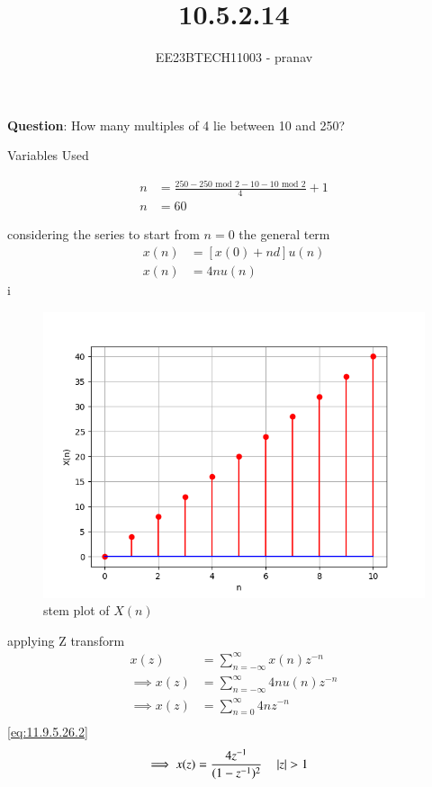 \documentclass[journal,12pt,twocolumn]{IEEEtran}
\theoremstyle{remark}
\begin{document}

\vspace{3cm}

\title{10.5.2.14}
\author{EE23BTECH11003 - pranav}
\maketitle
\newpage

\bigskip
\renewcommand{\thefigure}{\arabic{figure}}
\renewcommand{\thetable}{\arabic{table}}

\textbf{Question}:
How many multiples of 4 lie between 10 and 250?\\
\solution
\begin{table}[h]
    \centering
    
    \caption{Variables Used}
    \label{tab:table_11.9.3.6}
\end{table}
\begin{align}
    n&=\frac{250-250 \text{ mod } 2-10-10\text{ mod } 2}{4}+1\\
    n&=60
\end{align}
 
considering the series to start from $n=0$ the general term
\begin{align}
x(n)&=[x(0)+nd]u(n)\\
x(n)&=4nu(n)
\end{align}i
\begin{figure}[h!]
    \centering
    \includegraphics[width=1.1\linewidth]{figs/graph1.png}
    \caption{stem plot of $X(n)$}
\end{figure}

applying Z transform
\begin{align}
    x(z)&= \sum_{n=-\infty}^{\infty}x(n) z^{-n}\\
   \implies x(z)&= \sum_{n=-\infty}^{\infty} 4n u(n) z^{-n}\\
   \implies x(z) &=\sum_{n= 0}^{\infty} 4n  z^{-n}\\
   \end{align}
    \ref{eq:11.9.5.26.2}\\
   \begin{align}
   \implies x(z)&=\frac{4 z^{-1}}{(1-z^{-1})^{2}}\quad \left\vert z\right\vert>1
\end{align}
\end{document}
